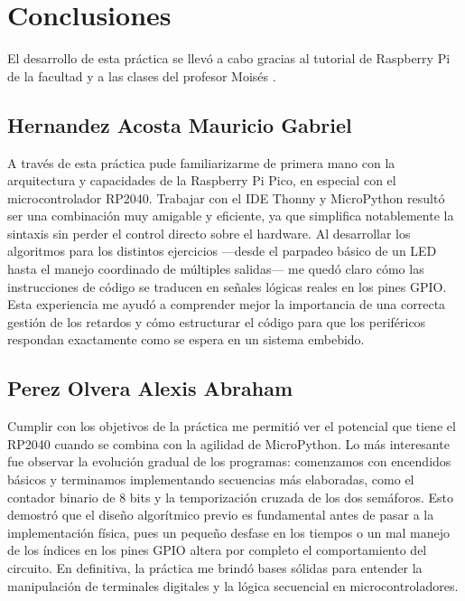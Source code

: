 \section{Conclusiones}

El desarrollo de esta práctica se llevó a cabo gracias al tutorial de Raspberry Pi de la facultad \cite{FI_UNAM_Raspberry_2026} y a las clases del profesor Moisés \cite{Melendez_Reyes_2026}.

\subsection{Hernandez Acosta Mauricio Gabriel}
A través de esta práctica pude familiarizarme de primera mano con la arquitectura y capacidades de la Raspberry Pi Pico, en especial con el microcontrolador RP2040. Trabajar con el IDE Thonny y MicroPython resultó ser una combinación muy amigable y eficiente, ya que simplifica notablemente la sintaxis sin perder el control directo sobre el hardware. Al desarrollar los algoritmos para los distintos ejercicios —desde el parpadeo básico de un LED hasta el manejo coordinado de múltiples salidas— me quedó claro cómo las instrucciones de código se traducen en señales lógicas reales en los pines GPIO. Esta experiencia me ayudó a comprender mejor la importancia de una correcta gestión de los retardos y cómo estructurar el código para que los periféricos respondan exactamente como se espera en un sistema embebido.

\subsection{Perez Olvera Alexis Abraham}
Cumplir con los objetivos de la práctica me permitió ver el potencial que tiene el RP2040 cuando se combina con la agilidad de MicroPython. Lo más interesante fue observar la evolución gradual de los programas: comenzamos con encendidos básicos y terminamos implementando secuencias más elaboradas, como el contador binario de 8 bits y la temporización cruzada de los dos semáforos. Esto demostró que el diseño algorítmico previo es fundamental antes de pasar a la implementación física, pues un pequeño desfase en los tiempos o un mal manejo de los índices en los pines GPIO altera por completo el comportamiento del circuito. En definitiva, la práctica me brindó bases sólidas para entender la manipulación de terminales digitales y la lógica secuencial en microcontroladores.

